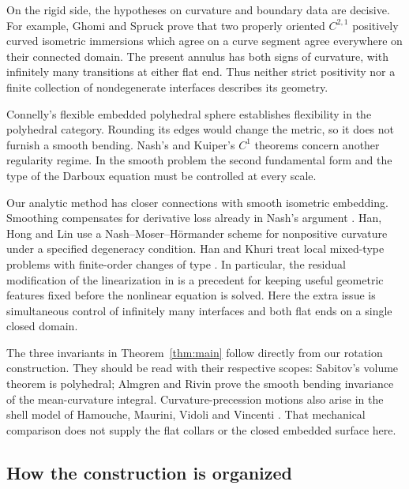 On the rigid side, the hypotheses on curvature and boundary data
are decisive. For example, Ghomi and Spruck
\cite[Theorem~1.1]{GhomiSpruck2020} prove that two properly oriented
$C^{2,1}$ positively curved isometric immersions which agree on a
curve segment agree everywhere on their connected domain. The present
annulus has both signs of curvature, with infinitely many transitions
at either flat end. Thus neither strict positivity nor a finite
collection of nondegenerate interfaces describes its geometry.

Connelly's flexible embedded polyhedral sphere \cite{Connelly1977}
establishes flexibility in the polyhedral category. Rounding its
edges would change the metric, so it does not furnish a smooth
bending. Nash's and Kuiper's $C^1$ theorems
\cite{Nash1954,Kuiper1955} concern another regularity regime. In the
smooth problem the second fundamental form and the type of the
Darboux equation must be controlled at every scale.

Our analytic method has closer connections with smooth isometric
embedding. Smoothing compensates for derivative loss already in
Nash's argument \cite{Nash1956}. Han, Hong and Lin
\cite[Theorem~1.1]{HanHongLin2003} use a Nash--Moser--H\"ormander
scheme for nonpositive curvature under a specified degeneracy
condition. Han and Khuri treat local mixed-type problems with
finite-order changes of type \cite{HanKhuri2010,HanKhuri2013}.
In particular, the residual modification of the linearization in
\cite[pp.~650--653]{HanKhuri2010} is a precedent for keeping useful
geometric features fixed before the nonlinear equation is solved.
Here the extra issue is simultaneous control of infinitely many
interfaces and both flat ends on a single closed domain.

The three invariants in Theorem~\ref{thm:main} follow directly from
our rotation construction. They should be read with their respective
scopes: Sabitov's volume theorem \cite{Sabitov1996} is polyhedral;
Almgren and Rivin \cite{AlmgrenRivin1998} prove the smooth bending
invariance of the mean-curvature integral. Curvature-precession
motions also arise in the shell model of Hamouche, Maurini, Vidoli
and Vincenti \cite{Hamouche2017}. That mechanical comparison does
not supply the flat collars or the closed embedded surface here.

\subsection{How the construction is organized}

